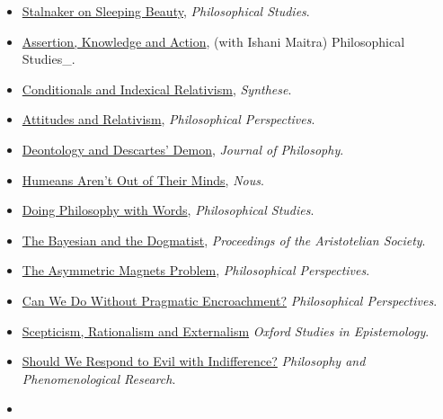 \documentclass[
  10pt,
  letterpaper,
  DIV=11,
  numbers=noendperiod,
  twoside]{scrartcl}
\begin{document}
\begin{itemize}
\item
  \href{https://brian.weatherson.org/quarto/posts/stalnaker-sleeping-beauity/stalnaker-on-sleeping-beauty.html}{Stalnaker
  on Sleeping Beauty}, \emph{Philosophical Studies}.
\item
  \href{https://brian.weatherson.org/quarto/posts/aka/assertion-knowledge-and-action.html}{Assertion,
  Knowledge and Action}, (with Ishani Maitra) Philosophical Studies\_.
\item
  \href{https://brian.weatherson.org/quarto/posts/cair/conditionals-and-indexical-relativism.html}{Conditionals
  and Indexical Relativism}, \emph{Synthese}.
\item
  \href{https://brian.weatherson.org/quarto/posts/relative-attitude/attitudes-and-relativism.html}{Attitudes
  and Relativism}, \emph{Philosophical Perspectives}.
\item
  \href{https://brian.weatherson.org/quarto/posts/ddd/deontology-and-descartess-demon.html}{Deontology
  and Descartes' Demon}, \emph{Journal of Philosophy}.
\item
  \href{https://brian.weatherson.org/quarto/posts/haootm/humeans-arent-out-of-their-minds.html}{Humeans
  Aren't Out of Their Minds}, \emph{Nous}.
\item
  \href{https://brian.weatherson.org/quarto/posts/dpww/doing-philosophy-with-words.html}{Doing
  Philosophy with Words}, \emph{Philosophical Studies}.
\item
  \href{https://brian.weatherson.org/quarto/posts/bayesdog/the-bayesian-and-the-dogmatist.html}{The
  Bayesian and the Dogmatist}, \emph{Proceedings of the Aristotelian
  Society}.
\item
  \href{https://brian.weatherson.org/quarto/posts/tamp/the-asymmetric-magnets-problem.html}{The
  Asymmetric Magnets Problem}, \emph{Philosophical Perspectives}.
\item
  \href{https://brian.weatherson.org/quarto/posts/cwpwpe/can-we-do-without-pragmatic-encroachment.html}{Can
  We Do Without Pragmatic Encroachment?} \emph{Philosophical
  Perspectives}.
\item
  \href{https://brian.weatherson.org/quarto/posts/sre/scepticism-rationalism-and-externalism.html}{Scepticism,
  Rationalism and Externalism} \emph{Oxford Studies in Epistemology}.
\item
  \href{https://brian.weatherson.org/quarto/posts/evil/should-we-respond-to-evil-with-indifference.html}{Should
  We Respond to Evil with Indifference?} \emph{Philosophy and
  Phenomenological Research}.
\item

\end{itemize}
\end{document}
